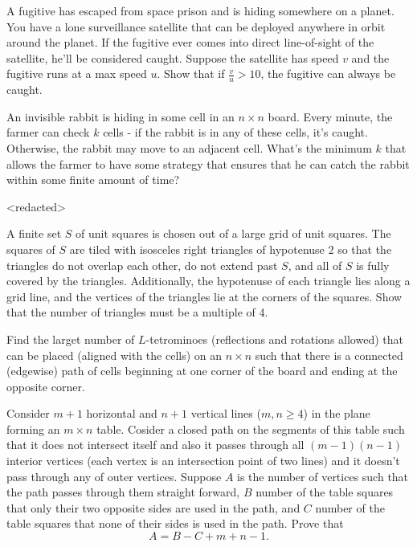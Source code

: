 
 {A fugitive has escaped from space prison and is hiding somewhere on a planet. You have a lone surveillance satellite that can be deployed anywhere in orbit around the planet. If the fugitive ever comes into direct line-of-sight of the satellite, he'll be considered caught. Suppose the satellite has speed $v$ and the fugitive runs at a max speed $u$. Show that if $\frac vu > 10$, the fugitive can always be caught.}

 {An invisible rabbit is hiding in some cell in an $n \times n$ board. Every minute, the farmer can check $k$ cells - if the rabbit is in any of these cells, it's caught. Otherwise, the rabbit may move to an adjacent cell. What's the minimum $k$ that allows the farmer to have some strategy that ensures that he can catch the rabbit within some finite amount of time?}



 {<redacted>}

 {A finite set $S$ of unit squares is chosen out of a large grid of unit squares. The squares of $S$ are tiled with isosceles right triangles of hypotenuse 2 so that the triangles do not overlap each other, do not extend past $S$, and all of $S$ is fully covered by the triangles. Additionally, the hypotenuse of each triangle lies along a grid line, and the vertices of the triangles lie at the corners of the squares. Show that the number of triangles must be a multiple of 4.}

 {Find the larget number of $L$-tetrominoes (reflections and rotations allowed) that can be placed (aligned with the cells) on an $n \times n$ such that there is a connected (edgewise) path of cells beginning at one corner of the board and ending at the opposite corner.}

 {Consider $m+1$ horizontal and $n+1$ vertical lines ($m,n\ge 4$) in the plane forming an $m\times n$ table. Cosider a closed path on the segments of this table such that it does not intersect itself and also it passes through all $(m-1)(n-1)$ interior vertices (each vertex is an intersection point of two lines) and it doesn't pass through any of outer vertices. Suppose $A$ is the number of vertices such that the path passes through them straight forward, $B$ number of the table squares that only their two opposite sides are used in the path, and $C$ number of the table squares that none of their sides is used in the path. Prove that
$$A=B-C+m+n-1.$$}

